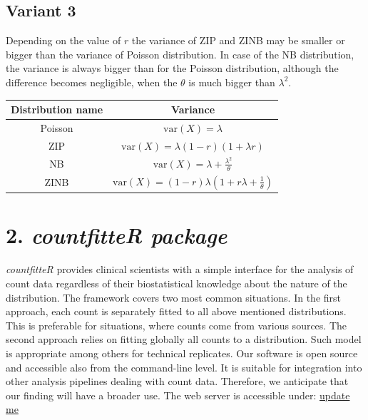 \subsection{Variant 3}

Depending on the value of $r$ the variance of ZIP and ZINB may be smaller or bigger than the variance of Poisson distribution. In case of the NB distribution, the variance is always bigger than for the Poisson distribution, although the difference becomes negligible, when the $\theta$ is much bigger than $\lambda^2$.

\begin{center}
\begin{tabular}{ |c|c| } 
\hline
\bfseries Distribution name & \bfseries Variance \\
\hline
Poisson & $\textrm{var}(X) = \lambda $ \\
\hline
ZIP & $\textrm{var}(X) = \lambda (1 - r)(1 + \lambda r)$ \\
\hline
NB & $\textrm{var}(X) = \lambda + \frac{\lambda^2}{\theta} $ \\
\hline
ZINB & $\textrm{var}(X) = (1 - r) \lambda \left( 1 + r\lambda  + \frac{1}{\theta} \right)$ \\
\hline
\end{tabular}
\end{center}


\section{2. \emph{countfitteR package}}


\emph{countfitteR} provides clinical scientists with a simple interface for the analysis of count data regardless of their biostatistical knowledge about the nature of the distribution. The framework covers two most common situations. In the first approach, each count is separately fitted to all above mentioned distributions. This is preferable for situations, where counts come from various sources. The second approach relies on fitting globally all counts to a distribution. Such model is appropriate among others for technical replicates.
Our software is open source and accessible also from the command-line level. It is suitable for integration into other analysis pipelines dealing with count data. Therefore, we anticipate that our finding will have a broader use. 
The web server is accessible under: 
\url{update me}

